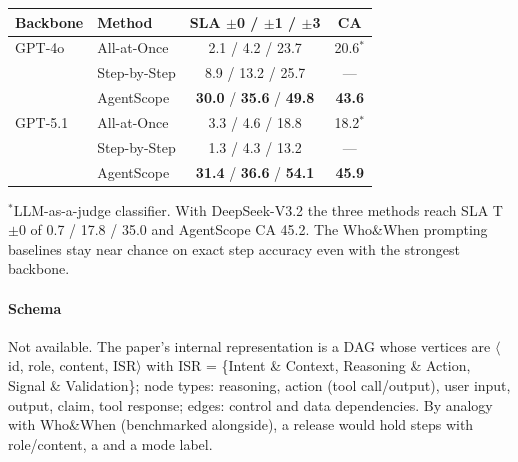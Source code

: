 \begin{center}\small
\begin{tabular}{@{}llcc@{}}\toprule
Backbone & Method & SLA $\pm$0 / $\pm$1 / $\pm$3 & CA\\\midrule
GPT-4o & All-at-Once & 2.1 / 4.2 / 23.7 & 20.6$^*$\\
 & Step-by-Step & 8.9 / 13.2 / 25.7 & ---\\
 & AgentScope & \textbf{30.0} / \textbf{35.6} / \textbf{49.8} & \textbf{43.6}\\
GPT-5.1 & All-at-Once & 3.3 / 4.6 / 18.8 & 18.2$^*$\\
 & Step-by-Step & 1.3 / 4.3 / 13.2 & ---\\
 & AgentScope & \textbf{31.4} / \textbf{36.6} / \textbf{54.1} & \textbf{45.9}\\\bottomrule
\end{tabular}
\end{center}
$^*$LLM-as-a-judge classifier. With DeepSeek-V3.2 the three methods reach SLA T$\pm$0 of 0.7 / 17.8 / 35.0 and AgentScope CA 45.2. The Who\&When prompting baselines stay near chance on exact step accuracy even with the strongest backbone.

\paragraph{Schema} Not available. The paper's internal representation is a DAG whose vertices are $\langle$id, role, content, ISR$\rangle$ with ISR = \{Intent \& Context, Reasoning \& Action, Signal \& Validation\}; node types: reasoning, action (tool call/output), user input, output, claim, tool response; edges: control and data dependencies. By analogy with Who\&When (benchmarked alongside), a release would hold steps with role/content, a  and a mode label.


